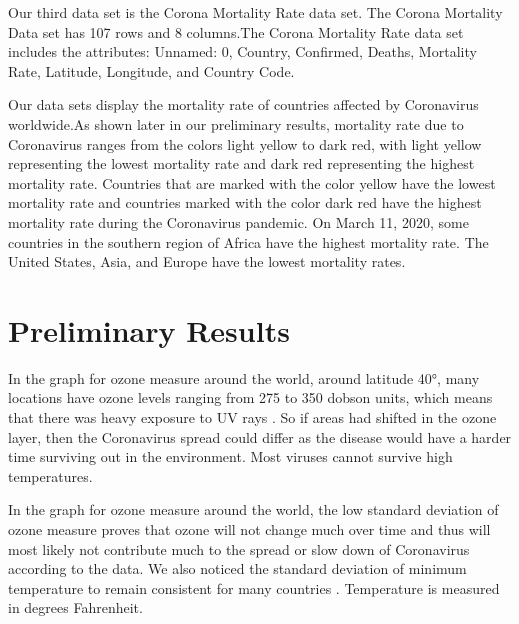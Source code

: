 \documentclass[10pt,journal,compsoc]{IEEEtran}
\begin{document}
{{	Our third data set is the Corona Mortality Rate data set. \cite{Mooney-2020} The Corona Mortality Data set has 107 rows and 8 columns.The Corona Mortality Rate data set includes the attributes: Unnamed: 0, Country, Confirmed, Deaths, Mortality Rate, Latitude, Longitude, and Country Code.

	Our data sets display the mortality rate of countries affected by Coronavirus worldwide.As shown later in our preliminary results, mortality rate due to Coronavirus ranges from the colors light yellow to dark red, with light yellow representing the lowest mortality rate and dark red representing the highest mortality rate. Countries that are marked with the color yellow have the lowest mortality rate and countries marked with the color dark red have the highest mortality rate during the Coronavirus pandemic. On March 11, 2020, some countries in the southern region of Africa have the highest mortality rate. The United States, Asia, and Europe have the lowest mortality rates.

\section{Preliminary Results}\label{sec:preliminary results}

	In the graph for ozone measure around the world, around latitude 40°, many locations have ozone levels ranging from 275 to 350 dobson units, which means that there was heavy exposure to UV rays . So if areas had shifted in the ozone layer, then the Coronavirus spread could differ as the disease would have a harder time surviving out in the environment. Most viruses cannot survive high temperatures. 

	In the graph for ozone measure around the world, the low standard deviation of ozone measure proves that ozone will not change much over time and thus will most likely not contribute much to the spread or slow down of Coronavirus according to the data. We also noticed the standard deviation of minimum temperature to remain consistent for many countries . Temperature is measured in degrees Fahrenheit. 

}}
\end{document}
